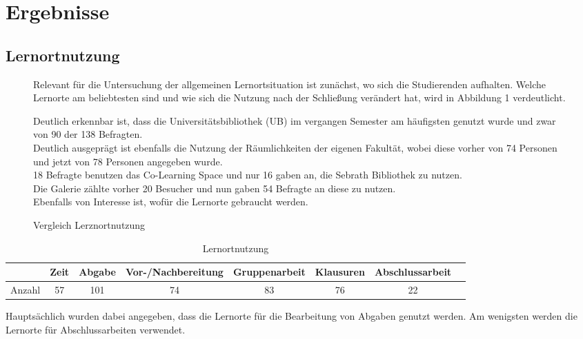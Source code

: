 \documentclass[11pt, a4paper]{article}
\begin{document}
\newpage
\section{Ergebnisse}
\subsection{Lernortnutzung}
\begin{figure}[h]
Relevant für die Untersuchung der allgemeinen Lernortsituation ist zunächst, wo sich die Studierenden aufhalten. Welche Lernorte am beliebtesten sind und wie sich die Nutzung nach der Schließung verändert hat, wird in Abbildung 1 verdeutlicht.

 
 \caption{Vergleich Lerznortnutzung }
\leavevmode

Deutlich erkennbar ist, dass die Universitätsbibliothek (UB) im vergangen Semester am häufigsten genutzt wurde und zwar von 90 der 138 Befragten.\\
Deutlich ausgeprägt ist ebenfalls die Nutzung der Räumlichkeiten der eigenen Fakultät, wobei diese vorher von 74 Personen und jetzt von 78 Personen angegeben wurde. \\
18 Befragte benutzen das Co-Learning Space und nur 16 gaben an, die Sebrath Bibliothek zu nutzen.\\
Die Galerie zählte vorher 20 Besucher und nun gaben 54 Befragte an diese zu nutzen.\\


Ebenfalls von Interesse ist, wofür die Lernorte gebraucht werden. 

\end{figure}
\begin{table}[h]
	\begin{tabular}{c|ccccccc}
		& Zeit & Abgabe & Vor-/Nachbereitung & Gruppenarbeit & Klausuren & Abschlussarbeit \\ \hline
		Anzahl & 57            & 101             & 74                          & 83                     & 76                 & 22                      
	\end{tabular}
		\caption{Lernortnutzung}
\end{table}

Hauptsächlich wurden dabei angegeben, dass die Lernorte für die Bearbeitung von Abgaben genutzt werden. Am wenigsten werden die Lernorte für Abschlussarbeiten verwendet.
\leavevmode
\end{document}
